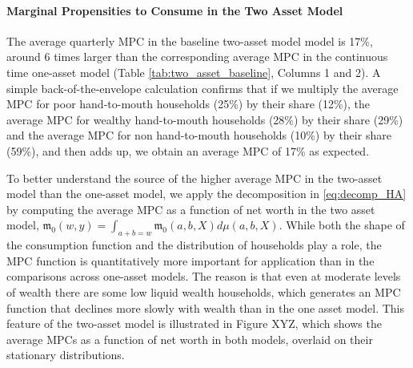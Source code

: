\paragraph{Marginal Propensities to Consume in the Two Asset Model} \label{sec:two_asset_results}
The average quarterly MPC in the baseline two-asset model model is 17\%, around 6 times larger than the corresponding average MPC in the continuous time one-asset model (Table \ref{tab:two_asset_baseline}, Columns 1 and 2). A simple back-of-the-envelope calculation confirms that if we multiply the average MPC for poor hand-to-mouth households (25\%) by their share (12\%), the average MPC for wealthy hand-to-mouth households (28\%) by their share (29\%) and the average MPC for non hand-to-mouth households (10\%) by their share (59\%), and then adds up, we obtain an average MPC of 17\% as expected.


To better understand the source of the higher average MPC in the two-asset model than the one-asset model, we apply the decomposition in \eqref{eq:decomp_HA} by computing the average MPC as a function of net worth in the two asset model, $\mathfrak{m}_0(w,y)=\int_{a+b=w}\mathfrak{m}_0(a,b,X)d\mu(a,b,X)$. While both the shape of the consumption function and the distribution of households play a role, the MPC function is quantitatively more important for application than in the comparisons across one-asset models. The reason is that even at moderate levels of wealth there are some low liquid wealth households, which generates an MPC function that declines more slowly with wealth than in the one asset model. This feature of the two-asset model is illustrated in Figure XYZ, which shows the average MPCs as a function of net worth in both models, overlaid on their stationary distributions.


